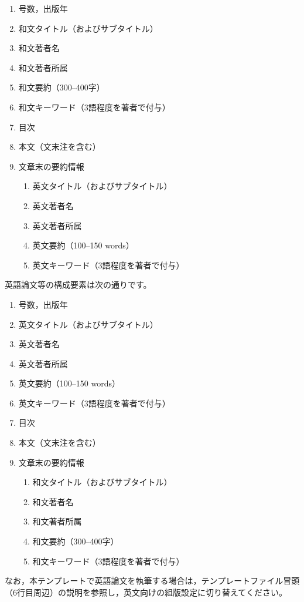 \documentclass[b5paper,10pt,twocolumn,tombow]{jarticle}
\begin{document}
\begin{enumerate}
  \item 号数，出版年
  \item 和文タイトル（およびサブタイトル）
  \item 和文著者名
  \item 和文著者所属
  \item 和文要約（300--400字）
  \item 和文キーワード（3語程度を著者で付与）
  \item 目次
  \item 本文（文末注を含む）
  \item 文章末の要約情報
  \begin{enumerate}
    \item 英文タイトル（およびサブタイトル）
    \item 英文著者名
    \item 英文著者所属
    \item 英文要約（100--150 words）
    \item 英文キーワード（3語程度を著者で付与）
  \end{enumerate}
\end{enumerate}

英語論文等の構成要素は次の通りです。
\begin{enumerate}
  \item 号数，出版年
  \item 英文タイトル（およびサブタイトル）
  \item 英文著者名
  \item 英文著者所属
  \item 英文要約（100--150 words）
  \item 英文キーワード（3語程度を著者で付与）
  \item 目次
  \item 本文（文末注を含む）
  \item 文章末の要約情報
  \begin{enumerate}
    \item 和文タイトル（およびサブタイトル）
    \item 和文著者名
    \item 和文著者所属
    \item 和文要約（300--400字）
    \item 和文キーワード（3語程度を著者で付与）
  \end{enumerate}
\end{enumerate}
なお，本テンプレートで英語論文を執筆する場合は，テンプレートファイル冒頭（6行目周辺）の説明を参照し，英文向けの組版設定に切り替えてください。
\end{document}
